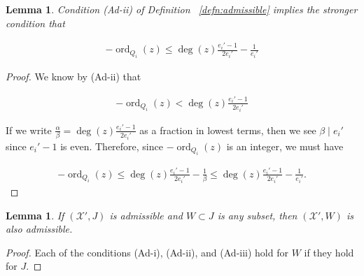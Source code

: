 \documentclass{amsart}
\theoremstyle{plain}
\newtheorem{lem}[thm]{Lemma}
\theoremstyle{definition}
\theoremstyle{remark}
\numberwithin{equation}{section}
\newcommand \sx{\mathscr X}
\DeclareMathOperator{\ord}{ord}
\newcommand \subhalf[1]{\frac{{#1} - 1}{2{#1}}}
\begin{document}
\begin{lem}
\label{lem:admissible_inequality}
Condition (Ad-ii) of Definition ~\ref{defn:admissible} implies the
stronger condition that

\begin{align*}
	-\ord_{Q_i}(z) \leq \deg(z) \subhalf{e_i'}-\frac{1}{e_i'}
\end{align*}
\end{lem}

\begin{proof}
We know by (Ad-ii) that

\begin{align*}
	-\ord_{Q_i}(z) < \deg(z) \subhalf{e_i'}
\end{align*}

\noindent
If we write $\frac{\alpha}{\beta} = \deg(z) \frac{e_i'-1}{2e_i'}$ 
as a fraction in lowest terms, then we see $\beta \mid e_i'$ since $
e_i'-1$ is even. Therefore, since $-\ord_{Q_i}(z)$ is an integer, 
we must have

\begin{align*}
	-\ord_{Q_i}(z) \leq \deg(z) \subhalf{e_i'}- \frac{1}{\beta} \leq 
	\deg(z) \subhalf{e_i'}- \frac{1}{e_i'}.
\end{align*}
\end{proof}

\begin{lem}
\label{lem:admissible_subset}
If $(\sx', J)$ is admissible and $W \subset J$ is any subset,
then $(\sx', W)$ is also admissible.
\end{lem}

\begin{proof}
Each of the conditions (Ad-i), (Ad-ii), and (Ad-iii) hold for $W$
if they hold for $J$.
\end{proof}
\end{document}
